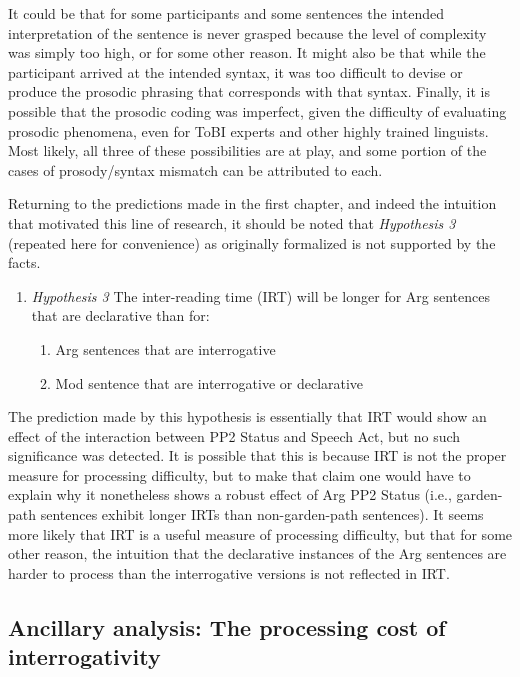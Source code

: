 \documentclass[11pt,oneside]{book}
\providecommand{\tightlist}{%
  \setlength{\itemsep}{0pt}\setlength{\parskip}{0pt}}
\begin{document}
It could be that for some participants and some sentences the intended interpretation of the sentence is never grasped because the level of complexity was simply too high, or for some other reason. It might also be that while the participant arrived at the intended syntax, it was too difficult to devise or produce the prosodic phrasing that corresponds with that syntax. Finally, it is possible that the prosodic coding was imperfect, given the difficulty of evaluating prosodic phenomena, even for ToBI experts and other highly trained linguists. Most likely, all three of these possibilities are at play, and some portion of the cases of prosody/syntax mismatch can be attributed to each.

Returning to the predictions made in the first chapter, and indeed the intuition that motivated this line of research, it should be noted that \emph{Hypothesis 3} (repeated here for convenience) as originally formalized is not supported by the facts.

\begin{enumerate}
\def\labelenumi{(\arabic{enumi})}
\setcounter{enumi}{43}
\tightlist
\item
  \emph{Hypothesis 3}
  The inter-reading time (IRT) will be longer for Arg sentences that are declarative than for:

  \begin{enumerate}
  \def\labelenumii{\alph{enumii}.}
  \tightlist
  \item
    Arg sentences that are interrogative
  \item
    Mod sentence that are interrogative or declarative
  \end{enumerate}
\end{enumerate}

The prediction made by this hypothesis is essentially that IRT would show an effect of the interaction between PP2 Status and Speech Act, but no such significance was detected. It is possible that this is because IRT is not the proper measure for processing difficulty, but to make that claim one would have to explain why it nonetheless shows a robust effect of Arg PP2 Status (i.e., garden-path sentences exhibit longer IRTs than non-garden-path sentences). It seems more likely that IRT is a useful measure of processing difficulty, but that for some other reason, the intuition that the declarative instances of the Arg sentences are harder to process than the interrogative versions is not reflected in IRT.

\hypertarget{qslow}{%
\subsection{Ancillary analysis: The processing cost of interrogativity}\label{qslow}}
\end{document}
